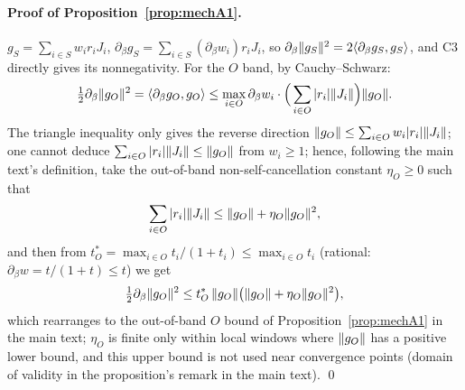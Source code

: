 \documentclass[11pt]{article}
\DeclarePairedDelimiter{\norm}{\lVert}{\rVert}
\numberwithin{equation}{section}
\begin{document}
\paragraph{Proof of Proposition~\ref{prop:mechA1}.}
$g_S=\sum_{i\in S}w_ir_iJ_i$, $\partial_\beta g_S=\sum_{i\in S}(\partial_\beta w_i)r_iJ_i$, so $\partial_\beta\norm{g_S}^2=2\langle\partial_\beta g_S,g_S\rangle$, and C3 directly gives its nonnegativity. For the $O$ band, by Cauchy--Schwarz:
\[
\tfrac12\partial_\beta\norm{g_O}^2=\langle\partial_\beta g_O,g_O\rangle
\le\max_{i\in O}\partial_\beta w_i\cdot\Big(\sum_{i\in O}|r_i|\norm{J_i}\Big)\norm{g_O}.
\]
The triangle inequality only gives the reverse direction $\norm{g_O}\le\sum_{i\in O}w_i|r_i|\norm{J_i}$; one cannot deduce $\sum_{i\in O}|r_i|\norm{J_i}\le\norm{g_O}$ from $w_i\ge1$; hence, following the main text's definition, take the out-of-band non-self-cancellation constant $\eta_O\ge0$ such that
\[
\sum_{i\in O}|r_i|\norm{J_i}\le\norm{g_O}+\eta_O\norm{g_O}^2,
\]
and then from $t_O^*=\max_{i\in O}t_i/(1+t_i)\le\max_{i\in O}t_i$ (rational: $\partial_\beta w=t/(1+t)\le t$) we get
\[
\tfrac12\partial_\beta\norm{g_O}^2\le t_O^*\,\norm{g_O}\big(\norm{g_O}+\eta_O\norm{g_O}^2\big),
\]
which rearranges to the out-of-band $O$ bound of Proposition~\ref{prop:mechA1} in the main text; $\eta_O$ is finite only within local windows where $\norm{g_O}$ has a positive lower bound, and this upper bound is not used near convergence points (domain of validity in the proposition's remark in the main text). \qed
\end{document}
